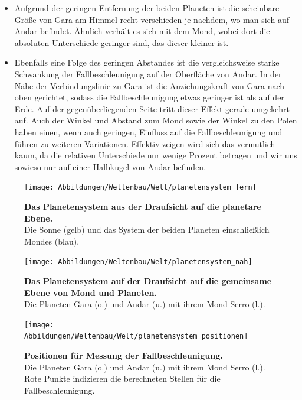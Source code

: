 \begin{itemize}
	\item Aufgrund der geringen Entfernung der beiden Planeten ist die scheinbare Größe von Gara am Himmel recht verschieden je nachdem, wo man sich auf Andar befindet. Ähnlich verhält es sich mit dem Mond, wobei dort die absoluten Unterschiede geringer sind, das dieser kleiner ist.
	\item Ebenfalls eine Folge des geringen Abstandes ist die vergleichsweise starke Schwankung der Fallbeschleunigung auf der Oberfläche von Andar. In der Nähe der Verbindungslinie zu Gara ist die Anziehungskraft von Gara nach oben gerichtet, sodass die Fallbeschleunigung etwas geringer ist als auf der Erde. Auf der gegenüberliegenden Seite tritt dieser Effekt gerade umgekehrt auf. Auch der Winkel und Abstand zum Mond sowie der Winkel zu den Polen haben einen, wenn auch geringen, Einfluss auf die Fallbeschleunigung und führen zu weiteren Variationen. Effektiv zeigen wird sich das vermutlich kaum, da die relativen Unterschiede nur wenige Prozent betragen und wir uns sowieso nur auf einer Halbkugel von Andar befinden.
\end{itemize}

\begin{figure}[tbh]
	\centering
	\texttt{[image: Abbildungen/Weltenbau/Welt/planetensystem\_fern]}
	\caption[Planetensystem Skizzen 1]{\textbf{Das Planetensystem aus der Draufsicht auf die planetare Ebene.}\\
	Die Sonne (gelb) und das System der beiden Planeten einschließlich Mondes (blau).}
	\label{fig:planetensystem_nah}
\end{figure}

\begin{figure}[tbh]
	\centering
	\texttt{[image: Abbildungen/Weltenbau/Welt/planetensystem\_nah]}
	\caption[Planetensystem Skizzen 2]{\textbf{Das Planetensystem auf der Draufsicht auf die gemeinsame Ebene von Mond und Planeten.}\\
	Die Planeten Gara (o.) und Andar (u.) mit ihrem Mond Serro (l.).}
	\label{fig:planetensystem_fern}
\end{figure}

\begin{figure}[tbh]
	\centering
	\texttt{[image: Abbildungen/Weltenbau/Welt/planetensystem\_positionen]}
	\caption[Planetensystem Skizzen 3]{\textbf{Positionen für Messung der Fallbeschleunigung.}\\
	Die Planeten Gara (o.) und Andar (u.) mit ihrem Mond Serro (l.). Rote Punkte indizieren die berechneten Stellen für die Fallbeschleunigung.}
	\label{fig:planetensystem_positionen}
\end{figure}

